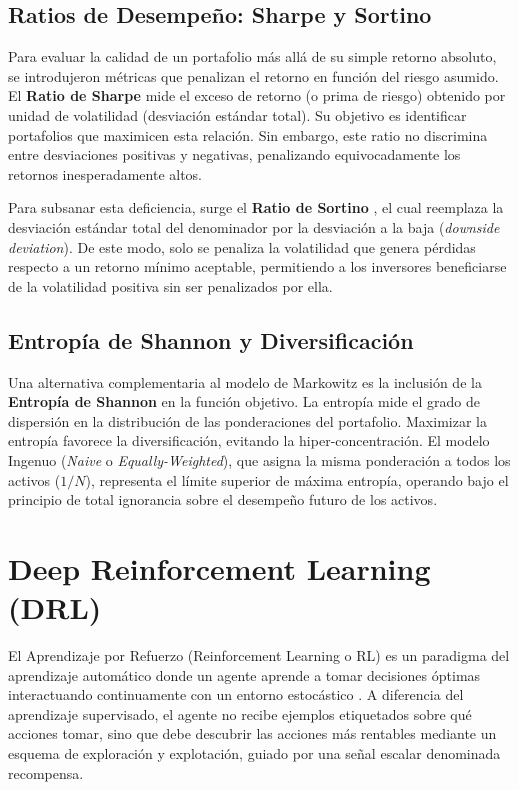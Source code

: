 \subsection{Ratios de Desempeño: Sharpe y Sortino}
Para evaluar la calidad de un portafolio más allá de su simple retorno absoluto, se introdujeron métricas que penalizan el retorno en función del riesgo asumido. El \textbf{Ratio de Sharpe} \citep{sharpe1966mutual} mide el exceso de retorno (o prima de riesgo) obtenido por unidad de volatilidad (desviación estándar total). Su objetivo es identificar portafolios que maximicen esta relación. Sin embargo, este ratio no discrimina entre desviaciones positivas y negativas, penalizando equivocadamente los retornos inesperadamente altos.

Para subsanar esta deficiencia, surge el \textbf{Ratio de Sortino} \citep{sortino1994performance}, el cual reemplaza la desviación estándar total del denominador por la desviación a la baja (\textit{downside deviation}). De este modo, solo se penaliza la volatilidad que genera pérdidas respecto a un retorno mínimo aceptable, permitiendo a los inversores beneficiarse de la volatilidad positiva sin ser penalizados por ella.

\subsection{Entropía de Shannon y Diversificación}
Una alternativa complementaria al modelo de Markowitz es la inclusión de la \textbf{Entropía de Shannon} \citep{shannon1948mathematical} en la función objetivo. La entropía mide el grado de dispersión en la distribución de las ponderaciones del portafolio. Maximizar la entropía favorece la diversificación, evitando la hiper-concentración. El modelo Ingenuo (\textit{Naive} o \textit{Equally-Weighted}), que asigna la misma ponderación a todos los activos ($1/N$), representa el límite superior de máxima entropía, operando bajo el principio de total ignorancia sobre el desempeño futuro de los activos.

\section{Deep Reinforcement Learning (DRL)}

El Aprendizaje por Refuerzo (Reinforcement Learning o RL) es un paradigma del aprendizaje automático donde un agente aprende a tomar decisiones óptimas interactuando continuamente con un entorno estocástico \citep{sutton2018reinforcement}. A diferencia del aprendizaje supervisado, el agente no recibe ejemplos etiquetados sobre qué acciones tomar, sino que debe descubrir las acciones más rentables mediante un esquema de exploración y explotación, guiado por una señal escalar denominada recompensa.

